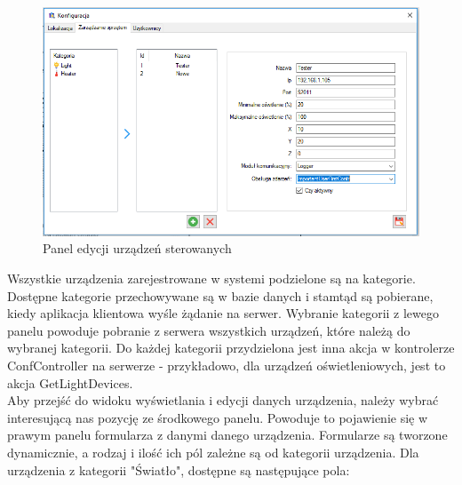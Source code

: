 \documentclass{article}
\begin{document}
		\begin{figure}[H]			
			\centering
			\caption{Panel edycji urządzeń sterowanych}
			\includegraphics[width=1.0\textwidth]{panel_konf_ster}
		\end{figure}
		Wszystkie urządzenia zarejestrowane w systemi podzielone są na kategorie. Dostępne kategorie przechowywane są w bazie danych i stamtąd są pobierane, kiedy aplikacja klientowa wyśle żądanie na serwer. Wybranie kategorii z lewego panelu powoduje pobranie z serwera wszystkich urządzeń, które należą do wybranej kategorii. Do każdej kategorii przydzielona jest inna akcja w kontrolerze ConfController na serwerze - przykładowo, dla urządzeń oświetleniowych, jest to akcja GetLightDevices.\\
		Aby przejść do widoku wyświetlania i edycji danych urządzenia, należy wybrać interesującą nas pozycję ze środkowego panelu. Powoduje to pojawienie się w prawym panelu formularza z danymi danego urządzenia. Formularze są tworzone dynamicznie, a rodzaj i ilość ich pól zależne są od kategorii urządzenia. Dla urządzenia z kategorii "Światło", dostępne są następujące pola:
\end{document}
